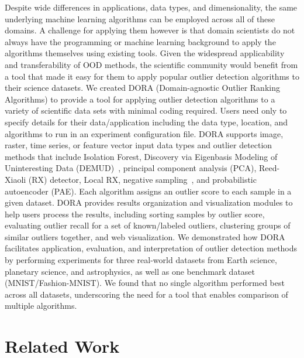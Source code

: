 \documentclass[utf8]{frontiersFPHY} %
\begin{document}
Despite wide differences in applications, data types, and dimensionality,
the same underlying machine learning algorithms can be employed across 
all of these domains. A challenge for applying them however is that domain
scientists do not always have the programming or machine learning background
to apply the algorithms themselves using existing tools. Given the widespread 
applicability and transferability of OOD methods, the scientific community 
would benefit from a tool that made it easy for them to apply popular outlier
detection algorithms to their science datasets. We created DORA 
(Domain-agnostic Outlier Ranking Algorithms) 
to provide a tool for applying outlier 
detection algorithms to a variety of scientific data sets with minimal coding
required. Users need only to specify details for their data/application 
including the data type, location, and algorithms to run in an experiment
configuration file. DORA supports image, raster, time series, 
or feature vector input data types and outlier detection methods that include
Isolation Forest, Discovery via Eigenbasis Modeling of Uninteresting Data 
(DEMUD)~\citep{wagstaff:demud13}, principal component analysis (PCA),
Reed-Xiaoli (RX) detector,  
Local RX, negative sampling~\cite{sipple:neg-sampling20}, and probabilistic 
autoencoder (PAE). 
Each algorithm assigns an outlier 
score to each sample in a given dataset. 
DORA provides results organization and visualization 
modules to help users process the results, including sorting samples by outlier 
score, evaluating outlier recall for a set of known/labeled outliers, clustering 
groups of similar outliers together, and web visualization. 
We demonstrated how DORA
facilitates application, evaluation, and interpretation of outlier detection
methods by performing
experiments for three real-world datasets from Earth science, planetary
science, and astrophysics, as well as one benchmark dataset 
(MNIST/Fashion-MNIST). We found that no single algorithm
performed best across all datasets, underscoring the need for a tool 
that enables comparison of multiple algorithms.



\section{Related Work}
\end{document}
